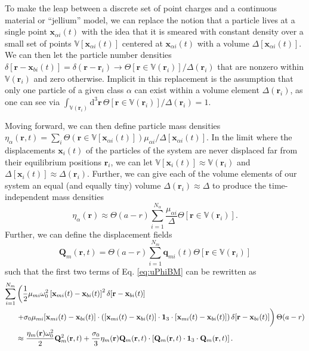 \documentclass{article}
\begin{document}
To make the leap between a discrete set of point charges and a continuous material or ``jellium'' model, we can replace the notion that a particle lives at a single point $\mathbf{x}_{\alpha i}(t)$ with the idea that it is smeared with constant density over a small set of points $\mathbb{V}[\mathbf{x}_{\alpha i}(t)]$ centered at $\mathbf{x}_{\alpha i}(t)$ with a volume $\Delta[\mathbf{x}_{\alpha i}(t)]$. We can then let the particle number densities $\delta[\mathbf{r} - \mathbf{x}_{bi}(t)] = \delta(\mathbf{r} - \mathbf{r}_i)\to\Theta[\mathbf{r}\in\mathbb{V}(\mathbf{r}_i)]/\Delta(\mathbf{r}_i)$ that are nonzero within $\mathbb{V}(\mathbf{r}_i)$ and zero otherwise. Implicit in this replacement is the assumption that only one particle of a given class $\alpha$ can exist within a volume element $\Delta(\mathbf{r}_i)$, as one can see via $\int_{\mathbb{V}(\mathbf{r}_i)}\mathrm{d}^3\mathbf{r}\,\Theta[\mathbf{r}\in\mathbb{V}(\mathbf{r}_i)]/\Delta(\mathbf{r}_i) = 1$. 

Moving forward, we can then define particle mass densities $\eta_\alpha(\mathbf{r},t) = \sum_i\Theta(\mathbf{r}\in\mathbb{V}[\mathbf{x}_{\alpha i}(t)])\mu_{\alpha i}/\Delta[\mathbf{x}_{\alpha i}(t)]$. In the limit where the displacements $\mathbf{x}_i(t)$ of the particles of the system are never displaced far from their equilibrium positions $\mathbf{r}_i$, we can let $\mathbb{V}[\mathbf{x}_i(t)]\approx\mathbb{V}(\mathbf{r}_i)$ and $\Delta[\mathbf{x}_i(t)]\approx\Delta(\mathbf{r}_i)$. Further, we can give each of the volume elements of our system an equal (and equally tiny) volume $\Delta(\mathbf{r}_i)\approx\Delta$ to produce the time-independent mass densities
\begin{equation}
\eta_{\alpha}(\mathbf{r}) \approx \Theta(a - r)\sum_{i = 1}^{N_\alpha}\frac{\mu_{\alpha i}}{\Delta}\Theta[\mathbf{r}\in\mathbb{V}(\mathbf{r}_i)].
\end{equation}
Further, we can define the displacement fields
\begin{equation}
\mathbf{Q}_m(\mathbf{r},t) = \Theta(a - r)\sum_{i = 1}^{N_m}\mathbf{q}_{mi}(t)\Theta[\mathbf{r}\in\mathbb{V}(\mathbf{r}_i)]
\end{equation}
such that the first two terms of Eq. \eqref{eq:uPhiBM} can be rewritten as
\begin{equation}
\begin{split}
\sum_{i = 1}^{N_m}&\left(\frac{1}{2}\mu_{mi}\omega_0^2\left[\mathbf{x}_{mi}(t) - \mathbf{x}_{bi}(t)\right]^2\delta[\mathbf{r} - \mathbf{x}_{bi}(t)]\right.\\
&\left.+ \sigma_0\mu_{mi}[\mathbf{x}_{mi}(t) - \mathbf{x}_{bi}(t)]\cdot\left([\mathbf{x}_{mi}(t) - \mathbf{x}_{bi}(t)]\cdot\bm{1}_3\cdot[\mathbf{x}_{mi}(t) - \mathbf{x}_{bi}(t)]\right)\delta[\mathbf{r} - \mathbf{x}_{bi}(t)] \vphantom{\frac{1}{2}} \right)\Theta(a - r)\\
&\approx \frac{\eta_m(\mathbf{r})\omega_0^2}{2}\mathbf{Q}_m^2(\mathbf{r},t) + \frac{\sigma_0}{3}\eta_m(\mathbf{r})\mathbf{Q}_m(\mathbf{r},t)\cdot\left[\mathbf{Q}_m(\mathbf{r},t)\cdot\bm{1}_3\cdot\mathbf{Q}_m(\mathbf{r},t)\right].
\end{split}
\end{equation}
\end{document}
